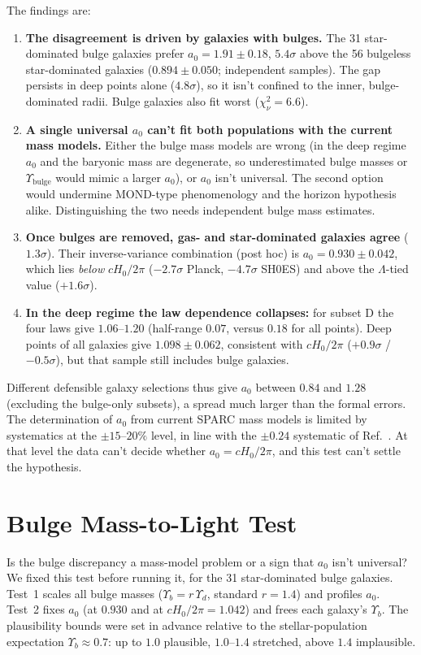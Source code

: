 \documentclass[11pt,a4paper]{article}
\begin{document}
The findings are:
\begin{enumerate}
\item \textbf{The disagreement is driven by galaxies with bulges.} The 31 star-dominated bulge galaxies prefer $a_0 = 1.91 \pm 0.18$, $5.4\sigma$ above the 56 bulgeless star-dominated galaxies ($0.894 \pm 0.050$; independent samples). The gap persists in deep points alone ($4.8\sigma$), so it isn't confined to the inner, bulge-dominated radii. Bulge galaxies also fit worst ($\chi^2_\nu = 6.6$).
\item \textbf{A single universal $a_0$ can't fit both populations with the current mass models.} Either the bulge mass models are wrong (in the deep regime $a_0$ and the baryonic mass are degenerate, so underestimated bulge masses or $\Upsilon_{\mathrm{bulge}}$ would mimic a larger $a_0$), or $a_0$ isn't universal. The second option would undermine MOND-type phenomenology and the horizon hypothesis alike. Distinguishing the two needs independent bulge mass estimates.
\item \textbf{Once bulges are removed, gas- and star-dominated galaxies agree} ($1.3\sigma$). Their inverse-variance combination (post hoc) is $a_0 = 0.930 \pm 0.042$, which lies \emph{below} $cH_0/2\pi$ ($-2.7\sigma$ Planck, $-4.7\sigma$ SH0ES) and above the $\Lambda$-tied value ($+1.6\sigma$).
\item \textbf{In the deep regime the law dependence collapses:} for subset D the four laws give $1.06$--$1.20$ (half-range $0.07$, versus $0.18$ for all points). Deep points of all galaxies give $1.098 \pm 0.062$, consistent with $cH_0/2\pi$ ($+0.9\sigma$ / $-0.5\sigma$), but that sample still includes bulge galaxies.
\end{enumerate}
Different defensible galaxy selections thus give $a_0$ between $0.84$ and $1.28$ (excluding the bulge-only subsets), a spread much larger than the formal errors. The determination of $a_0$ from current SPARC mass models is limited by systematics at the $\pm15$--$20\%$ level, in line with the $\pm0.24$ systematic of Ref.~\cite{mcgaugh2016rar}. At that level the data can't decide whether $a_0 = cH_0/2\pi$, and this test can't settle the hypothesis.

\section{Bulge Mass-to-Light Test}
\label{sec:bulge}
Is the bulge discrepancy a mass-model problem or a sign that $a_0$ isn't universal? We fixed this test before running it, for the 31 star-dominated bulge galaxies. Test~1 scales all bulge masses ($\Upsilon_b = r\,\Upsilon_d$, standard $r = 1.4$) and profiles $a_0$. Test~2 fixes $a_0$ (at $0.930$ and at $cH_0/2\pi = 1.042$) and frees each galaxy's $\Upsilon_b$. The plausibility bounds were set in advance relative to the stellar-population expectation $\Upsilon_b \approx 0.7$: up to $1.0$ plausible, $1.0$--$1.4$ stretched, above $1.4$ implausible.
\end{document}
